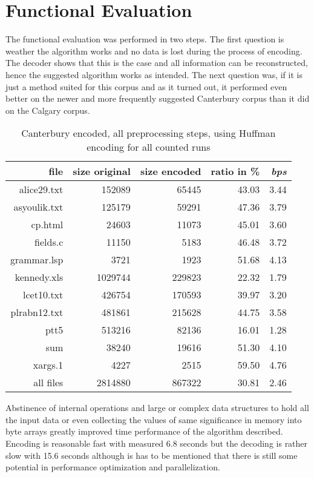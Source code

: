 \section{Functional Evaluation}
\label{ch:Evaluation:sec:Functional Evaluation}
\par{
The functional evaluation was performed in two steps. The first question is weather the algorithm works and no data is lost during the process of encoding. The decoder shows that this is the case and all information can be reconstructed, hence the suggested algorithm works as intended. The next question was, if it is just a method suited for this corpus and as it turned out, it performed even better on the newer and more frequently suggested Canterbury corpus than it did on the Calgary corpus.
}
	\begin{table}[h]
	\centering
	\begin{tabular}{r|r|r|r|r}	
		file & size original & size encoded & ratio in \% & \textit{bps}\\
		\hline
alice29.txt & 152089 & 65445 & 43.03 & 3.44 \\
asyoulik.txt & 125179 & 59291 & 47.36 & 3.79 \\
cp.html & 24603 & 11073 & 45.01 & 3.60 \\
fields.c & 11150 & 5183 & 46.48 & 3.72 \\
grammar.lsp & 3721 & 1923 & 51.68 & 4.13 \\
kennedy.xls & 1029744 & 229823 & 22.32 & 1.79 \\
lcet10.txt & 426754 & 170593 & 39.97 & 3.20 \\
plrabn12.txt & 481861 & 215628 & 44.75 & 3.58 \\
ptt5 & 513216 & 82136 & 16.01 & 1.28 \\
sum & 38240 & 19616 & 51.30 & 4.10 \\
xargs.1 & 4227 & 2515 & 59.50 & 4.76 \\
		\hline
		all files & 2814880 & 867322 & 30.81 & 2.46
	\end{tabular}
	\caption{Canterbury encoded, all preprocessing steps, using Huffman encoding for all counted runs}
	\label{tab:t100:Canterbury encoded, all preprocessing steps, using Huffman encoding for all counted runs}
\end{table}

\par{
Abstinence of internal operations and large or complex data structures to hold all the input data or even collecting the values of same significance in memory into byte arrays greatly improved time performance of the algorithm described. Encoding is reasonable fast with measured 6.8 seconds but the decoding is rather slow with 15.6 seconds although is has to be mentioned that there is still some potential in performance optimization and parallelization.
}


